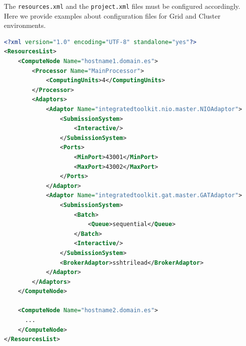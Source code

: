 The \texttt{resources.xml} and the \texttt{project.xml} files must be configured accordingly.
Here we provide examples about configuration files for Grid and Cluster environments.

\begin{lstlisting}[language=xml]
<?xml version="1.0" encoding="UTF-8" standalone="yes"?>                                                                                                                                                            
<ResourcesList>                                                                                                                                                                                                    
    <ComputeNode Name="hostname1.domain.es">                                                                                                                                                                       
        <Processor Name="MainProcessor">                                                                                                                                                                           
            <ComputingUnits>4</ComputingUnits>                                                                                                                                                                     
        </Processor>                                                                                                                                                                                               
        <Adaptors>                                                                                                                                                                                                 
            <Adaptor Name="integratedtoolkit.nio.master.NIOAdaptor">                                                                                                                                               
                <SubmissionSystem>
                    <Interactive/>
                </SubmissionSystem>
                <Ports>
                    <MinPort>43001</MinPort>
                    <MaxPort>43002</MaxPort>
                </Ports>
            </Adaptor>
            <Adaptor Name="integratedtoolkit.gat.master.GATAdaptor">
                <SubmissionSystem>
                    <Batch>
                        <Queue>sequential</Queue>
                    </Batch>
                    <Interactive/>
                </SubmissionSystem>
                <BrokerAdaptor>sshtrilead</BrokerAdaptor>
            </Adaptor>
        </Adaptors>
    </ComputeNode>
    
    <ComputeNode Name="hostname2.domain.es">
      ...
    </ComputeNode>
</ResourcesList>
\end{lstlisting}

